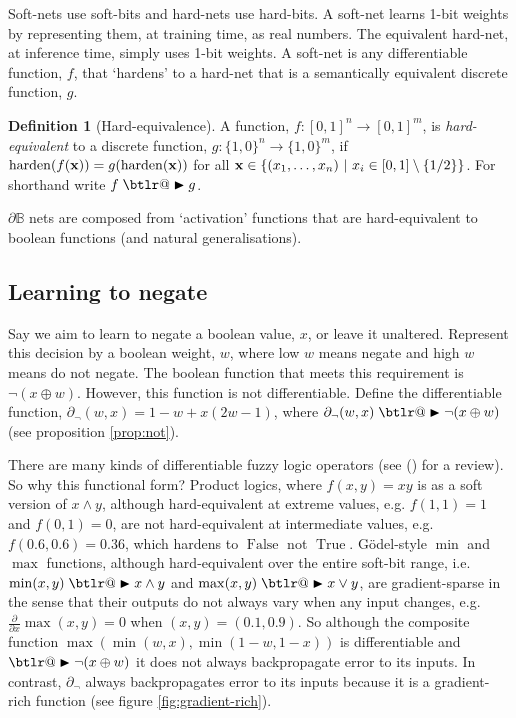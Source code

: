 \documentclass{article}
\makeatletter
\theoremstyle{plain}
\theoremstyle{definition}
\newtheorem{definition}[theorem]{Definition}
\theoremstyle{remark}
\DeclareRobustCommand{\btright}{\mathrel{\mathpalette\btlr@\blacktriangleright}}
\newcommand{\btlr@}[2]{%
	\begingroup
	\sbox\z@{$\m@th#1\triangleright$}%
	\sbox\tw@{\resizebox{1.1\wd\z@}{1.1\ht\z@}{\raisebox{\depth}{$\m@th#1\mkern-1mu#2$}}}%
	\ht\tw@=\ht\z@ \dp\tw@=\dp\z@ \wd\tw@=\wd\z@
	\copy\tw@
	\endgroup
}
\newcommand{\citemyauthoryear}[1]{\citeauthor{#1} (\citeyear{#1})}
\makeatother
\begin{document}
Soft-nets use soft-bits and hard-nets use hard-bits. A soft-net learns 1-bit weights by representing them, at training time, as real numbers. The equivalent hard-net, at inference time, simply uses 1-bit weights. 
A soft-net is any differentiable function, $f$, that `hardens' to a hard-net that is a semantically equivalent discrete function, $g$.

\begin{definition}[Hard-equivalence]
	A function, $f: [0,1]^n \rightarrow [0,1]^m$, is {\em hard-equivalent} to a discrete function, $g: \{1,0\}^n \rightarrow \{1,0\}^m$,	if $\operatorname{harden}(f({\bf x})) = g(\operatorname{harden}({\bf x}))$
	for all ${\bf x} \in \{(x_{1}, \dots, x_{n}) ~|~ x_{i} \in [0,1] \setminus \{1/2\}\}$. For shorthand write $f \btright g$.
\end{definition}

$\partial \mathbb{B}$ nets are composed from `activation' functions that are hard-equivalent to boolean functions (and natural generalisations).

\subsection{Learning to negate}

Say we aim to learn to negate a boolean value, $x$, or leave it unaltered. Represent this decision by a boolean weight, $w$, where low $w$ means negate and high $w$ means do not negate. The boolean function that meets this requirement is $\neg(x \oplus w)$. However, this function is not differentiable. Define the differentiable function,
$\partial_{\neg}(w, x) = 1 - w + x (2w - 1)$,
where $\partial_{\neg}(w, x) \btright \neg(x \oplus w)$ (see proposition \ref{prop:not}).

There are many kinds of differentiable fuzzy logic operators (see \citemyauthoryear{VANKRIEKEN2022103602} for a review). So why this functional form? Product logics, where $f(x,y) = x y$ is as a soft version of $x \wedge y$, although hard-equivalent at extreme values, e.g. $f(1,1)=1$ and $f(0,1)=0$, are not hard-equivalent at intermediate values, e.g. $f(0.6, 0.6) = 0.36$, which hardens to $\operatorname{False}$ not $\operatorname{True}$. G\"{o}del-style $\operatorname{min}$ and $\operatorname{max}$ functions, although hard-equivalent over the entire soft-bit range, i.e. $\operatorname{min}(x,y) \btright x \wedge y$ and $\operatorname{max}(x,y) \btright x \vee y$, are gradient-sparse in the sense that their outputs do not always vary when any input changes, e.g. $\frac{\partial}{\partial x} \operatorname{max}(x,y) = 0$ when $(x,y)=(0.1, 0.9)$. So although the composite function $\operatorname{max}(\operatorname{min}(w, x), \operatorname{min}(1-w, 1-x))$ is differentiable and $\btright \neg(x \oplus w)$ it does not always backpropagate error to its inputs. In contrast, $\partial_{\neg}$ always backpropagates error to its inputs because it is a gradient-rich function (see figure \ref{fig:gradient-rich}). 
\end{document}
